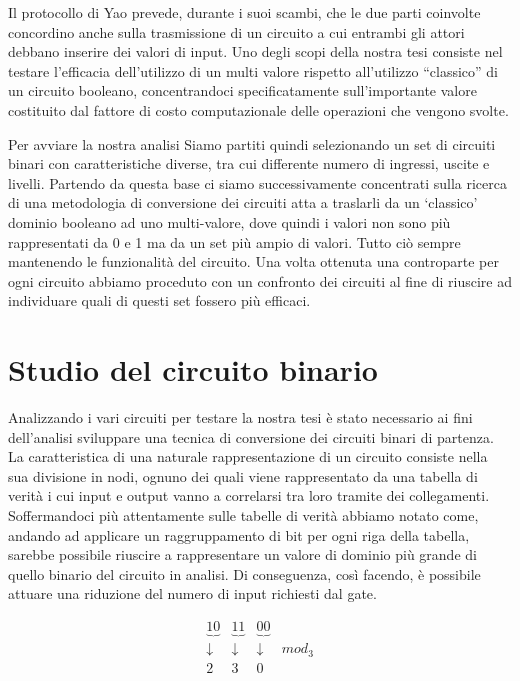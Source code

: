 \documentclass[
  italian,
]{book}
\begin{document}
Il protocollo di Yao prevede, durante i suoi scambi, che le due parti coinvolte concordino anche sulla trasmissione di un circuito a cui entrambi gli attori debbano inserire dei valori di input. Uno degli scopi della nostra tesi consiste nel testare l'efficacia dell'utilizzo di un multi valore rispetto all'utilizzo ``classico'' di un circuito booleano, concentrandoci specificatamente sull'importante valore costituito dal fattore di costo computazionale delle operazioni che vengono svolte.

Per avviare la nostra analisi Siamo partiti quindi selezionando un set di circuiti binari con caratteristiche diverse, tra cui differente numero di ingressi, uscite e livelli. Partendo da questa base ci siamo successivamente concentrati sulla ricerca di una metodologia di conversione dei circuiti atta a traslarli da un `classico' dominio booleano ad uno multi-valore, dove quindi i valori non sono più rappresentati da 0 e 1 ma da un set più ampio di valori. Tutto ciò sempre mantenendo le funzionalità del circuito. Una volta ottenuta una controparte per ogni circuito abbiamo proceduto con un confronto dei circuiti al fine di riuscire ad individuare quali di questi set fossero più efficaci.

\newpage

\hypertarget{studio-del-circuito-binario}{%
\section{Studio del circuito binario}\label{studio-del-circuito-binario}}

Analizzando i vari circuiti per testare la nostra tesi è stato necessario ai fini dell'analisi sviluppare una tecnica di conversione dei circuiti binari di partenza. La caratteristica di una naturale rappresentazione di un circuito consiste nella sua divisione in nodi, ognuno dei quali viene rappresentato da una tabella di verità i cui input e output vanno a correlarsi tra loro tramite dei collegamenti. Soffermandoci più attentamente sulle tabelle di verità abbiamo notato come, andando ad applicare un raggruppamento di bit per ogni riga della tabella, sarebbe possibile riuscire a rappresentare un valore di dominio più grande di quello binario del circuito in analisi. Di conseguenza, così facendo, è possibile attuare una riduzione del numero di input richiesti dal gate.

\[\begin{matrix}
    \underbrace{10} & \underbrace{11} & \underbrace{00} \\
    \downarrow & \downarrow & \downarrow  &mod_3 \\
    2 & 3 & 0
\end{matrix}\]
\end{document}
